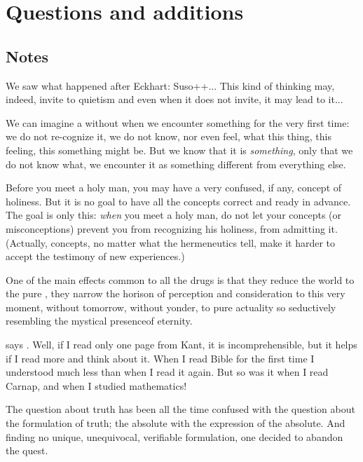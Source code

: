 \chapter*{Questions and additions}
\setcounter{PARAGRAPH}{0}

\section*{Notes}

We saw what happened after Eckhart: Suso++... This kind of thinking may, indeed,
invite to quietism and even when it does not invite, it may lead to it...

We can imagine a  without  when we 
encounter something for the very first time: we do not re-cognize it, 
we do not know, nor even feel, what this thing, this feeling, this 
something might be. But we know that it is {\em something}, only that we 
do not know what, we encounter it as something different from everything else.

Before you meet a holy man, you may have a very confused, if any, 
concept of holiness. But it is no goal to have all the concepts 
correct and ready in advance. The goal is only this: {\em when} you 
meet a holy man, do not let your concepts (or misconceptions) prevent 
you from recognizing his holiness, from admitting it. (Actually, concepts, no 
matter what the hermeneutics tell, make it harder to accept the 
testimony of new experiences.)


One of the main effects common to all the drugs is that they reduce 
the world to the pure \herenow, they narrow the horison of perception 
and consideration to this very moment, without tomorrow, without 
yonder, to pure actuality so seductively resembling the mystical 
presenceof eternity.

says . Well, if I read 
only one page from Kant, it is incomprehensible, but it helps if I 
read more and think about it. When I read Bible for the first time I 
understood much less than when I read it again. But so was it when I 
read Carnap, and when I studied mathematics!

The question about truth has been all the time confused with the 
question about the formulation of truth; the absolute 
with the expression of the absolute. And finding no unique, 
unequivocal, verifiable formulation, one decided to abandon the quest.

